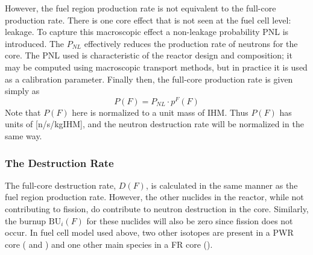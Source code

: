 However, the fuel region production rate is not equivalent to the full-core production rate.  There is one 
core effect that is not seen at the fuel cell level: leakage.  To capture this macroscopic effect a 
non-leakage probability PNL is introduced.  The $P_{NL}$ effectively reduces the production rate of 
neutrons for the core. The PNL used is characteristic of the reactor design and composition; it may 
be computed using macroscopic transport methods, but in practice it is used as a calibration parameter.  
Finally then, the full-core production rate is given simply as 
\begin{equation}
\label{1g_P_F}
P(F) = P_{NL} \cdot p^F(F)
\end{equation}
Note that $P(F)$ here is normalized to a unit mass of IHM.  Thus $P(F)$ has units of [n/s/kgIHM], 
and the neutron destruction rate will be normalized in the same way.



\subsubsection{The Destruction Rate}
\label{1g_sec:d_rate}
The full-core destruction rate, $D(F)$, is calculated in the same manner as the fuel 
region production rate.  However, the other nuclides in the reactor, while not contributing 
to fission, do contribute to neutron destruction in the core. Similarly, the burnup $\mbox{BU}_i(F)$ 
for these nuclides will also be zero since fission does not occur. In fuel cell model used above, 
two other isotopes are present in a PWR core ( and ) and one other main species 
in a FR core ().

